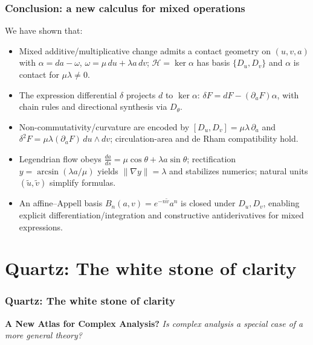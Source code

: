 \documentclass[aspectratio=169]{beamer}
\begin{document}
\begin{frame}
    \frametitle{Conclusion: a new calculus for mixed operations}
    We have shown that:
    \begin{itemize}
        \item Mixed additive/multiplicative change admits a contact geometry on $(u,v,a)$ with $\alpha=da-\omega$, $\omega=\mu\,du+\lambda a\,dv$; $\mathcal{H}=\ker\alpha$ has basis $\{D_u,D_v\}$ and $\alpha$ is contact for $\mu\lambda\neq 0$.
        \item The expression differential $\delta$ projects $d$ to $\ker\alpha$: $\delta F=dF-(\partial_aF)\alpha$, with chain rules and directional synthesis via $D_\theta$.
        \item Non-commutativity/curvature are encoded by $[D_u,D_v]=\mu\lambda\,\partial_a$ and $\delta^2F=\mu\lambda(\partial_aF)\,du\wedge dv$; circulation-area and de Rham compatibility hold.
        \item Legendrian flow obeys $\frac{da}{ds}=\mu\cos\theta+\lambda a\sin\theta$; rectification $y=\arcsin(\lambda a/\mu)$ yields $\|\nabla y\|=\lambda$ and stabilizes numerics; natural units $(\tilde u,\tilde v)$ simplify formulas.
        \item An affine–Appell basis $B_n(a,v)=e^{-n\tilde v}a^n$ is closed under $D_u,D_v$, enabling explicit differentiation/integration and constructive antiderivatives for mixed expressions.
    \end{itemize}
\end{frame}


\section{Quartz: The white stone of clarity}

\begin{frame}
    \frametitle{Quartz: The white stone of clarity}
    \begin{center}
        \Large
        \textbf{A New Atlas for Complex Analysis?}
        \newline\newline
        \emph{Is complex analysis a special case of a more general theory?}
    \end{center}
\end{frame}
\end{document}

